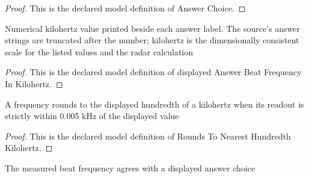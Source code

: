 \begin{proof}
  This is the declared model definition of Answer Choice.
\end{proof}
\begin{definition}
  \label{def:physics:phyx-mini-0525:phyxminiproblems-problemphyxmini0525-displayedanswerbeatfrequencyinkilohertz}
  Numerical kilohertz value printed beside each answer label. The source's answer strings are truncated after the number; kilohertz is the dimensionally consistent scale for the listed values and the radar calculation
\end{definition}
\begin{proof}
  This is the declared model definition of displayed Answer Beat Frequency In Kilohertz.
\end{proof}
\begin{definition}
  \label{def:physics:phyx-mini-0525:phyxminiproblems-problemphyxmini0525-roundstonearesthundredthkilohertz}
  A frequency rounds to the displayed hundredth of a kilohertz when its readout is strictly within 0.005 kHz of the displayed value
\end{definition}
\begin{proof}
  This is the declared model definition of Rounds To Nearest Hundredth Kilohertz.
\end{proof}
\begin{definition}
  \label{def:physics:phyx-mini-0525:phyxminiproblems-problemphyxmini0525-matchesanswerchoice}
  The measured beat frequency agrees with a displayed answer choice
\end{definition}
